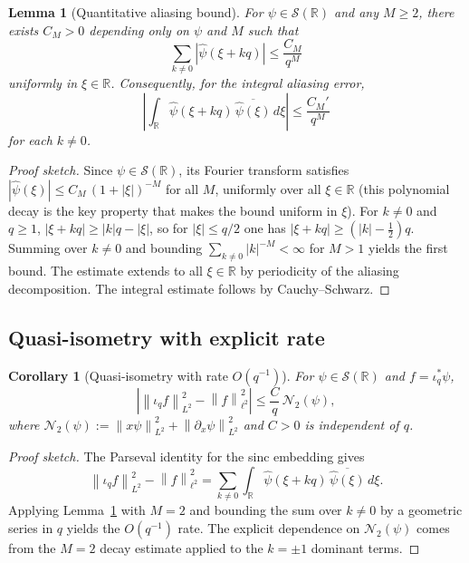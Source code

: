 \documentclass[12pt,a4paper]{article}
\newtheorem{lemma}[theorem]{Lemma}
\newtheorem{corollary}[theorem]{Corollary}
\newcommand{\Schwartz}{\mathcal{S}(\mathbb{R})}
\newcommand{\iotaq}{\iota_q}
\newcommand{\iotastar}{\iota_q^*}
\newcommand{\norm}[1]{\left\|#1\right\|}
\newcommand{\abs}[1]{\left|#1\right|}
\begin{document}
      \begin{lemma}[Quantitative aliasing bound]
        \label{lem:aliasing}
        For $\psi \in \Schwartz$ and any $M \geq 2$, there exists $C_M > 0$ depending only on
        $\psi$ and $M$ such that
        \[
          \sum_{k \neq 0} \abs{\hat{\psi}(\xi + kq)} \leq \frac{C_M}{q^M}
        \]
        uniformly in $\xi \in \mathbb{R}$.
        Consequently, for the integral aliasing error,
        \[
          \abs{\int_{\mathbb{R}} \hat{\psi}(\xi + kq)\,\overline{\hat{\psi}(\xi)}\,d\xi}
          \leq \frac{C_M'}{q^M}
        \]
        for each $k \neq 0$.
      \end{lemma}

      \begin{proof}
        [Proof sketch]
Since $\psi \in \Schwartz$, its Fourier transform satisfies
$\abs{\hat{\psi}(\xi)} \leq C_M\,(1 + \abs{\xi})^{-M}$ for all $M$, uniformly over all $\xi \in \mathbb{R}$
(this polynomial decay is the key property that makes the bound uniform in $\xi$).
For $k \neq 0$ and $q \geq 1$, $\abs{\xi + kq} \geq \abs{k}q - \abs{\xi}$,
so for $\abs{\xi} \leq q/2$ one has $\abs{\xi + kq} \geq (\abs{k} - \tfrac{1}{2})q$.
Summing over $k \neq 0$ and bounding $\sum_{k \neq 0} \abs{k}^{-M} < \infty$ for $M > 1$
yields the first bound.
The estimate extends to all $\xi \in \mathbb{R}$ by periodicity of the aliasing decomposition.
The integral estimate follows by Cauchy--Schwarz.
      \end{proof}

    \subsection{Quasi-isometry with explicit rate}

      \begin{corollary}[Quasi-isometry with rate $O(q^{-1})$]
        \label{cor:quasi-iso}
        For $\psi \in \Schwartz$ and $f = \iotastar\psi$,
        \[
          \abs{\norm{\iotaq f}_{L^2}^2 - \norm{f}_{\ell^2}^2}
          \leq \frac{C}{q}\,\mathcal{N}_2(\psi),
        \]
        where $\mathcal{N}_2(\psi) := \norm{x\psi}_{L^2}^2 + \norm{\partial_x\psi}_{L^2}^2$
        and $C > 0$ is independent of $q$.
      \end{corollary}

      \begin{proof}
        [Proof sketch]
The Parseval identity for the sinc embedding gives
\[
  \norm{\iotaq f}_{L^2}^2 - \norm{f}_{\ell^2}^2
  = \sum_{k \neq 0} \int_{\mathbb{R}} \hat{\psi}(\xi + kq)\,\overline{\hat{\psi}(\xi)}\,d\xi.
\]
Applying Lemma~\ref{lem:aliasing} with $M = 2$ and bounding the sum over $k \neq 0$
by a geometric series in $q$ yields the $O(q^{-1})$ rate.
The explicit dependence on $\mathcal{N}_2(\psi)$ comes from the $M = 2$ decay estimate
applied to the $k = \pm 1$ dominant terms.
      \end{proof}
\end{document}
